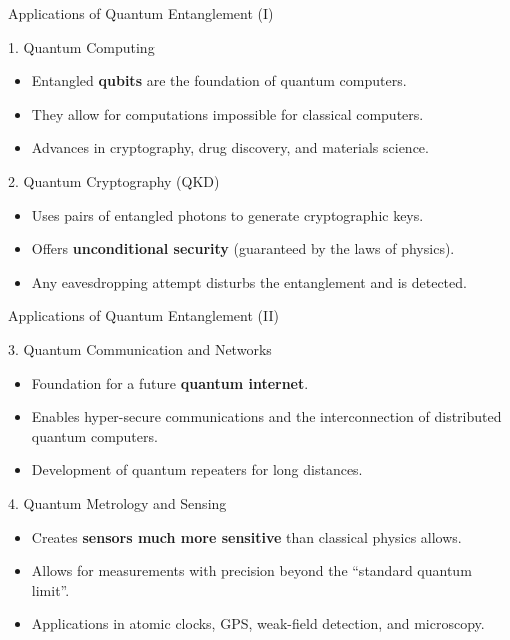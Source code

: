\begin{frame}{Applications of Quantum Entanglement (I)}

  \begin{block}{1. Quantum Computing}
    \begin{itemize}[<+->]
      \item Entangled \textbf{qubits} are the foundation of quantum computers.
      \item They allow for computations impossible for classical computers.
      \item Advances in cryptography, drug discovery, and materials science.
    \end{itemize}
  \end{block}

  \begin{alertblock}{2. Quantum Cryptography (QKD)}
    \begin{itemize}[<+->]
      \item Uses pairs of entangled photons to generate cryptographic keys.
      \item Offers \textbf{unconditional security} (guaranteed by the laws of physics).
      \item Any eavesdropping attempt disturbs the entanglement and is detected.
    \end{itemize}
  \end{alertblock}

\end{frame}

\begin{frame}{Applications of Quantum Entanglement (II)}

  \begin{block}{3. Quantum Communication and Networks}
    \begin{itemize}[<+->]
      \item Foundation for a future \textbf{quantum internet}.
      \item Enables hyper-secure communications and the interconnection of distributed quantum computers.
      \item Development of quantum repeaters for long distances.
    \end{itemize}
  \end{block}

  \begin{alertblock}{4. Quantum Metrology and Sensing}
    \begin{itemize}[<+->]
      \item Creates \textbf{sensors much more sensitive} than classical physics allows.
      \item Allows for measurements with precision beyond the ``standard quantum limit''.
      \item Applications in atomic clocks, GPS, weak-field detection, and microscopy.
    \end{itemize}
  \end{alertblock}

\end{frame}

